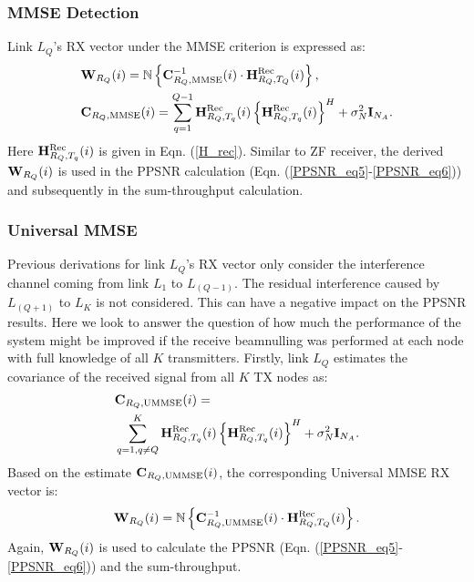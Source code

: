 \documentclass[journal, final]{IEEEtran}
\begin{document}
\subsubsection{MMSE Detection}

Link $L_Q $'s RX vector under the MMSE criterion is expressed as:
\begin{align}
\label{MMSE_1}
&{\rm {\bf W}}_{R_Q } (i) = {\mathbb{N}}\left\{ {{\rm {\bf C}}_{R_Q
,{\rm MMSE}}^{ - 1} (i) \cdot {\rm {\bf H}}_{R_Q ,T_Q }^{{\rm Rec}} (i)}
\right\}, \\
\label{MMSE_2}
&{\rm {\bf C}}_{R_Q ,{\rm MMSE}} (i) = \sum\limits_{q = 1}^{Q-1} {{\rm
{\bf H}}_{R_Q ,T_q }^{{\rm Rec}} (i)\left\{ {{\rm {\bf H}}_{R_Q ,T_q
}^{{\rm Rec}} (i)} \right\}^H} + \sigma _N^2 {\rm {\bf I}}_{N_A }.
\end{align}
Here ${\rm {\bf H}}_{R_Q ,T_q }^{{\rm Rec}} (i)$ is given in Eqn. (\ref{H_rec}). Similar to ZF receiver, the derived ${\rm {\bf W}}_{R_Q }
(i)$ is used in the PPSNR calculation (Eqn. (\ref{PPSNR_eq5}-\ref{PPSNR_eq6})) and subsequently in the
sum-throughput calculation.

\subsubsection{Universal MMSE}

Previous derivations for link $L_Q $'s RX vector only consider the
interference channel coming from link $L_1 $ to $L_{(Q - 1)} $. The
residual interference caused by $L_{(Q + 1)}$ to $L_K$ is not
considered. This can  have a negative impact on the PPSNR results. Here we look to answer the question of how much the performance of the system might be improved if the receive beamnulling was performed at each node with full knowledge of all $K$ transmitters. Firstly, link $L_Q$ estimates the covariance of the
received signal from all $K$ TX nodes as:
\begin{align}
\label{MMSE_3}
&{\rm {\bf C}}_{R_Q ,{\rm UMMSE}} (i) =\notag\\
&\sum\limits_{q = 1, q\neq Q}^K {{\rm {\bf
H}}_{R_Q ,T_q }^{{\rm Rec}} (i)\left\{ {{\rm {\bf H}}_{R_Q ,T_q
}^{{\rm Rec}} (i)} \right\}^H} + \sigma _N^2 {\rm {\bf I}}_{N_A } .
\end{align}
Based on the estimate ${\rm {\bf C}}_{R_Q ,{\rm UMMSE}} (i)$, the
corresponding Universal MMSE RX vector is:
\begin{equation}
\label{MMSE_4}
{\rm {\bf W}}_{R_Q } (i) = {\mathbb{N}}\left\{ {{\rm {\bf C}}_{R_Q
,{\rm UMMSE}}^{-1}(i)\cdot{\rm {\bf
H}}_{R_Q ,T_Q }^{{\rm Rec}} (i)} \right\}.
\end{equation}
Again, ${\rm {\bf W}}_{R_Q }(i)$ is used to calculate the PPSNR (Eqn. (\ref{PPSNR_eq5}-\ref{PPSNR_eq6})) and the
sum-throughput.
\end{document}
